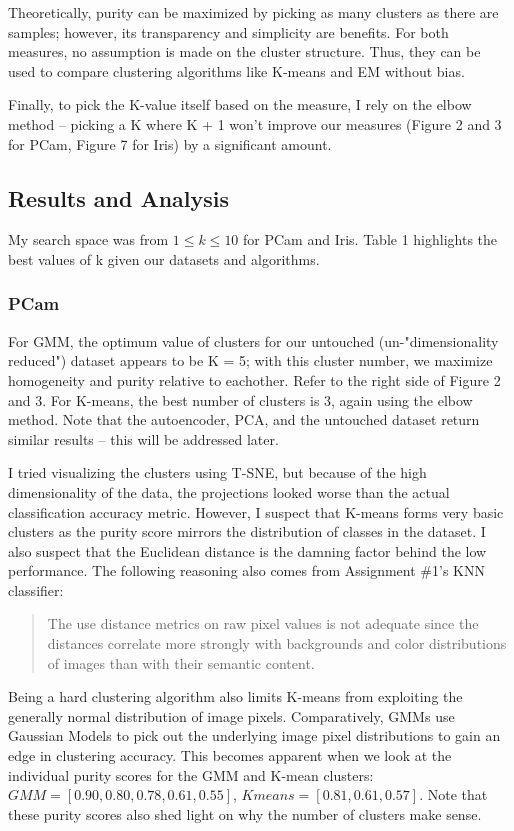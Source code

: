 \documentclass[letter]{article}
\begin{document}
Theoretically, purity can be maximized by picking as many clusters as there are samples; however, its transparency and simplicity are benefits. For both measures, no assumption is made on the cluster structure. Thus, they can be used to compare clustering algorithms like K-means and EM without bias.

Finally, to pick the K-value itself based on the measure, I rely on the elbow method -- picking a K where K + 1 won't improve our measures (Figure 2 and 3 for PCam, Figure 7 for Iris) by a significant amount\autocite{Thorndike1953}.

\subsection{Results and Analysis}
My search space was from $1 \leq k \leq 10$ for PCam and Iris. Table 1 highlights the best values of k given our datasets and algorithms.

\subsubsection{PCam}
For GMM, the optimum value of clusters for our untouched (un-"dimensionality reduced") dataset appears to be K = 5; with this cluster number, we maximize homogeneity and purity relative to eachother. Refer to the right side of Figure 2 and 3. For K-means, the best number of clusters is 3, again using the elbow method. Note that the autoencoder, PCA, and the untouched dataset return similar results -- this will be addressed later.

I tried visualizing the clusters using T-SNE, but because of the high dimensionality of the data, the projections looked worse than the actual classification accuracy metric. However, I suspect that K-means forms very basic clusters as the purity score mirrors the distribution of classes in the dataset. I also suspect that the Euclidean distance is the damning factor behind the low performance. The following reasoning also comes from Assignment \#1's KNN classifier:
\begin{quote}
  The use distance metrics on raw pixel values is not adequate since the distances correlate more strongly with backgrounds and color distributions of images than with their semantic content.\autocite{Stanford-Img} 
\end{quote}

Being a hard clustering algorithm also limits K-means from exploiting the generally normal distribution of image pixels. Comparatively, GMMs use Gaussian Models to pick out the underlying image pixel distributions to gain an edge in clustering accuracy. This becomes apparent when we look at the individual purity scores for the GMM and K-mean clusters: $GMM=[0.90, 0.80, 0.78 , 0.61, 0.55]$, $Kmeans=[0.81, 0.61, 0.57]$. Note that these purity scores also shed light on why the number of clusters make sense. 
\end{document}

